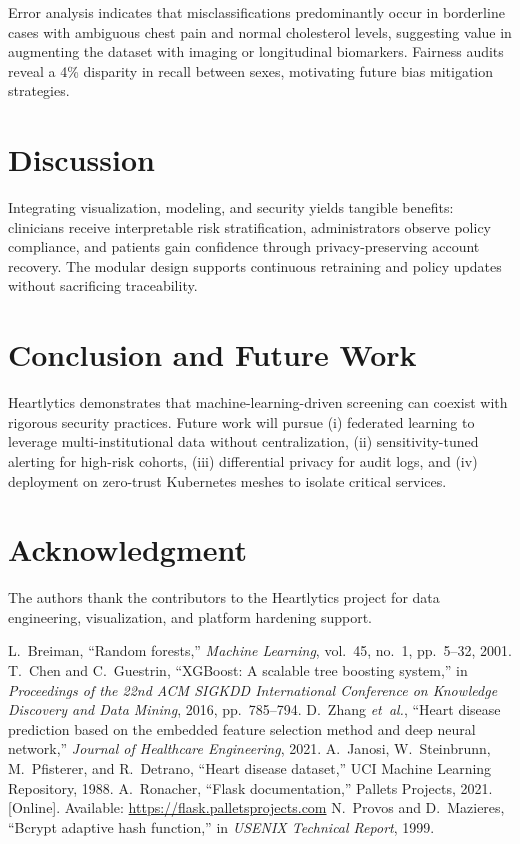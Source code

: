 \documentclass[conference]{IEEEtran}
\begin{document}
Error analysis indicates that misclassifications predominantly occur in borderline cases with ambiguous chest pain and normal cholesterol levels, suggesting value in augmenting the dataset with imaging or longitudinal biomarkers. Fairness audits reveal a 4\% disparity in recall between sexes, motivating future bias mitigation strategies.

\section{Discussion}
Integrating visualization, modeling, and security yields tangible benefits: clinicians receive interpretable risk stratification, administrators observe policy compliance, and patients gain confidence through privacy-preserving account recovery. The modular design supports continuous retraining and policy updates without sacrificing traceability.

\section{Conclusion and Future Work}
Heartlytics demonstrates that machine-learning-driven screening can coexist with rigorous security practices. Future work will pursue (i) federated learning to leverage multi-institutional data without centralization, (ii) sensitivity-tuned alerting for high-risk cohorts, (iii) differential privacy for audit logs, and (iv) deployment on zero-trust Kubernetes meshes to isolate critical services.

\section*{Acknowledgment}
The authors thank the contributors to the Heartlytics project for data engineering, visualization, and platform hardening support.

\begin{thebibliography}{1}
 L.~Breiman, ``Random forests,'' \emph{Machine Learning}, vol.~45, no.~1, pp.~5--32, 2001.
 T.~Chen and C.~Guestrin, ``XGBoost: A scalable tree boosting system,'' in \emph{Proceedings of the 22nd ACM SIGKDD International Conference on Knowledge Discovery and Data Mining}, 2016, pp.~785--794.
 D.~Zhang \emph{et~al.}, ``Heart disease prediction based on the embedded feature selection method and deep neural network,'' \emph{Journal of Healthcare Engineering}, 2021.
 A.~Janosi, W.~Steinbrunn, M.~Pfisterer, and R.~Detrano, ``Heart disease dataset,'' UCI Machine Learning Repository, 1988.
 A.~Ronacher, ``Flask documentation,'' Pallets Projects, 2021. [Online]. Available: \url{https://flask.palletsprojects.com}
 N.~Provos and D.~Mazieres, ``Bcrypt adaptive hash function,'' in \emph{USENIX Technical Report}, 1999.
\end{thebibliography}
\end{document}

